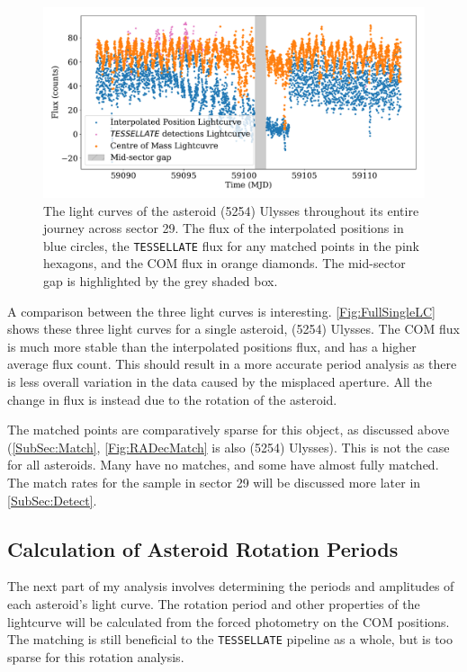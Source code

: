 \documentclass{UCreport}
\begin{document}
\begin{figure}
  \centering
  \includegraphics[width =\textwidth]{./Figures/SingleBodyLCUlyssesgapSpan.pdf}
  \caption[Lightcurve Example]{The light curves of the asteroid (5254) Ulysses throughout its entire journey across sector 29.
    The flux of the interpolated positions in blue circles, the \texttt{TESSELLATE} flux for any matched points in the pink hexagons, and the COM flux in orange diamonds.
    The mid-sector gap is highlighted by the grey shaded box.}
  \label{Fig:FullSingleLC}
\end{figure}

A comparison between the three light curves is interesting.
\autoref{Fig:FullSingleLC} shows these three light curves for a single asteroid, (5254) Ulysses.
The COM flux is much more stable than the interpolated positions flux, and has a higher average flux count.
This should result in a more accurate period analysis as there is less overall variation in the data caused by the misplaced aperture.
All the change in flux is instead due to the rotation of the asteroid.

The matched points are comparatively sparse for this object, as discussed above (\autoref{SubSec:Match}, \autoref{Fig:RADecMatch} is also (5254) Ulysses).
This is not the case for all asteroids.
Many have no matches, and some have almost fully matched.
The match rates for the sample in sector 29 will be discussed more later in \autoref{SubSec:Detect}.

\subsection{Calculation of Asteroid Rotation Periods}\label{SubSec:Periods}

The next part of my analysis involves determining the periods and amplitudes of each asteroid's light curve.
The rotation period and other properties of the lightcurve will be calculated from the forced photometry on the COM positions. 
The matching is still beneficial to the \texttt{TESSELLATE} pipeline as a whole, but is too sparse for this rotation analysis.
\end{document}
